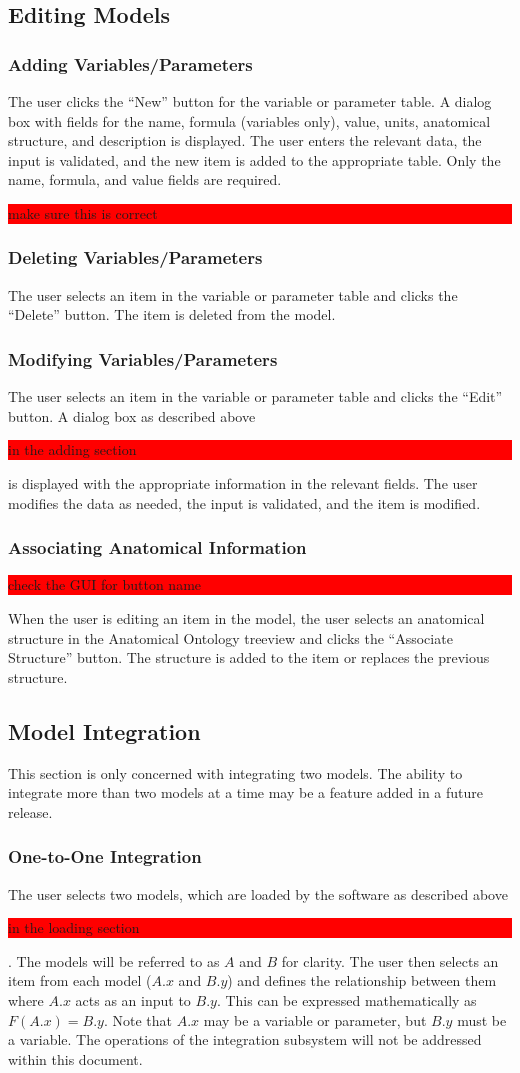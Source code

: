 \documentclass{article}
\newcommand{\todo}[1]{\colorbox{red}{\begin{minipage}{\textwidth}{#1}\end{minipage}}}
\begin{document}
\subsection{Editing Models}
\subsubsection{Adding Variables/Parameters}
The user clicks the ``New'' button for the variable or parameter table. A dialog box with fields for the name, formula (variables only), value, units, anatomical structure, and description is displayed. The user enters the relevant data, the input is validated, and the new item is added to the appropriate table. Only the name, formula, and value fields are required.
\todo{make sure this is correct}
\subsubsection{Deleting Variables/Parameters}
The user selects an item in the variable or parameter table and clicks the ``Delete'' button. The item is deleted from the model.
\subsubsection{Modifying Variables/Parameters}
The user selects an item in the variable or parameter table and clicks the ``Edit'' button. A dialog box as described above \todo{in the adding section} is displayed with the appropriate information in the relevant fields. The user modifies the data as needed, the input is validated, and the item is modified.
\subsubsection{Associating Anatomical Information}
\todo{check the GUI for button name}
When the user is editing an item in the model, the user selects an anatomical structure in the Anatomical Ontology treeview and clicks the ``Associate Structure'' button. The structure is added to the item or replaces the previous structure.
\subsection{Model Integration}
This section is only concerned with integrating two models. The ability to integrate more than two models at a time may be a feature added in a future release.
\subsubsection{One-to-One Integration}
The user selects two models, which are loaded by the software as described above \todo{in the loading section}. The models will be referred to as $A$ and $B$ for clarity. The user then selects an item from each model ($A.x$ and $B.y$) and defines the relationship between them where $A.x$ acts as an input to $B.y$. This can be expressed mathematically as $F(A.x) = B.y$. Note that $A.x$ may be a variable or parameter, but $B.y$ must be a variable. The operations of the integration subsystem will not be addressed within this document.
\end{document}
